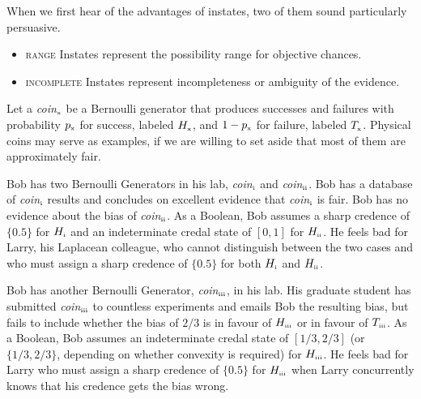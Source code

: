 \documentclass[11pt]{article}
\begin{document}
When we first hear of the advantages of instates, two of them sound
particularly persuasive.

\begin{itemize}
\item \textsc{range} Instates represent the possibility range for
  objective chances.
\item \textsc{incomplete} Instates represent incompleteness or ambiguity
  of the evidence.
\end{itemize}

Let a \textit{coin}$_{\mbox{\tiny{x}}}$ be a Bernoulli generator that
produces successes and failures with probability $p_{\mbox{\tiny{x}}}$
for success, labeled $H_{\mbox{\tiny{x}}}$, and
$1-p_{\mbox{\tiny{x}}}$ for failure, labeled $T_{\mbox{\tiny{x}}}$.
Physical coins may serve as examples, if we are willing to set aside
that most of them are approximately fair.

\begin{quotex}
  \label{ex:range} Bob has two Bernoulli Generators in
  his lab, \textit{coin}$_{\mbox{\tiny{i}}}$ and
  \textit{coin}$_{\mbox{\tiny{ii}}}$. Bob has a database of
  \textit{coin}$_{\mbox{\tiny{i}}}$ results and concludes on excellent
  evidence that \textit{coin}$_{\mbox{\tiny{i}}}$ is fair. Bob has no
  evidence about the bias of \textit{coin}$_{\mbox{\tiny{ii}}}$. As a
  Boolean, Bob assumes a sharp credence of $\{0.5\}$ for
  $H_{\mbox{\tiny{i}}}$ and an indeterminate credal state of $[0,1]$
  for $H_{\mbox{\tiny{ii}}}$. He feels bad for Larry, his Laplacean
  colleague, who cannot distinguish between the two cases and who must
  assign a sharp credence of $\{0.5\}$ for both $H_{\mbox{\tiny{i}}}$
  and $H_{\mbox{\tiny{ii}}}$.
\end{quotex}

\begin{quotex}
  \label{ex:incomp} Bob has another Bernoulli
  Generator, \textit{coin}$_{\mbox{\tiny{iii}}}$, in his lab. His
  graduate student has submitted \textit{coin}$_{\mbox{\tiny{iii}}}$
  to countless experiments and emails Bob the resulting bias, but
  fails to include whether the bias of $2/3$ is in favour of
  $H_{\mbox{\tiny{iii}}}$ or in favour of $T_{\mbox{\tiny{iii}}}$. As
  a Boolean, Bob assumes an indeterminate credal state of $[1/3,2/3]$
  (or $\{1/3,2/3\}$, depending on whether convexity is required) for
  $H_{\mbox{\tiny{iii}}}$. He feels bad for Larry who must assign a
  sharp credence of $\{0.5\}$ for $H_{\mbox{\tiny{iii}}}$ when Larry
  concurrently knows that his credence gets the bias wrong.
\end{quotex}
\end{document}
